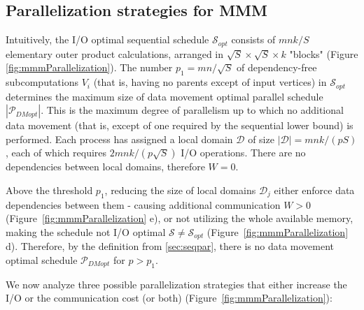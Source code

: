 \documentclass[sigplan,review,anonymous]{acmart}\settopmatter{printfolios=true,printccs=false,printacmref=false}
\begin{document}
\subsection{Parallelization strategies for MMM}
 Intuitively, the 
I/O optimal sequential schedule $\mathcal{S}_{opt}$
consists of $mnk/S$ elementary outer product calculations, arranged in
$\sqrt{S} \times \sqrt{S} \times k$ "blocks" (Figure
\ref{fig:mmmParallelization}). The number $p_1 = mn/\sqrt{S}$ of 
dependency-free subcomputations 
$V_i$
(that is, having no parents except of input vertices) in $\mathcal{S}_{opt}$ 
determines the maximum size of data movement optimal parallel schedule 
$|\mathcal{P}_{DMopt}|$. This is the maximum 
degree of parallelism up to which no
additional data movement (that is, except of one required by the sequential 
lower bound) is performed. Each process has assigned a local domain 
$\mathcal{D}$ of size 
$|\mathcal{D}| = mnk/(pS)$, each of which requires $2mnk/(p\sqrt{S})$ I/O 
operations. 
There are 
no dependencies between local domains, therefore $W = 0$.

Above the  
threshold $p_1$, reducing the size of 
local domains $\mathcal{D}_j$ either enforce data dependencies between them - 
causing
additional communication $W > 0$ (Figure~\ref{fig:mmmParallelization} 
e), or not 
utilizing the whole available memory, making the schedule not I/O optimal 
$\mathcal{S} \ne \mathcal{S}_{opt}$ 
(Figure~\ref{fig:mmmParallelization} d). Therefore, by the definition from  
\cref{sec:seqpar}, there is no data movement optimal schedule 
$\mathcal{P}_{DMopt}$ for $p > p_1$.


We now analyze three possible parallelization strategies that either increase 
the I/O or the communication cost (or both) 
(Figure~\ref{fig:mmmParallelization}):
\end{document}
